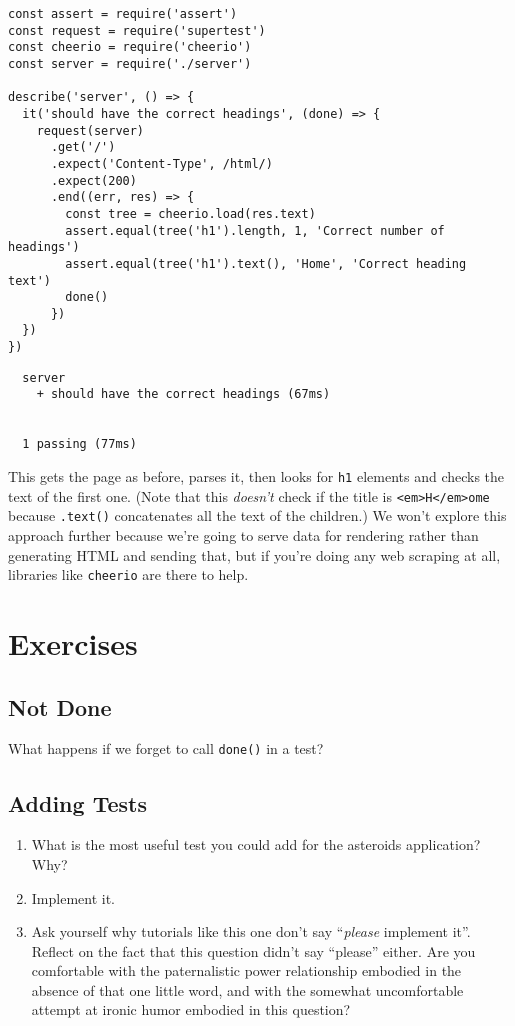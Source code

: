 \begin{verbatim}
const assert = require('assert')
const request = require('supertest')
const cheerio = require('cheerio')
const server = require('./server')

describe('server', () => {
  it('should have the correct headings', (done) => {
    request(server)
      .get('/')
      .expect('Content-Type', /html/)
      .expect(200)
      .end((err, res) => {
        const tree = cheerio.load(res.text)
        assert.equal(tree('h1').length, 1, 'Correct number of headings')
        assert.equal(tree('h1').text(), 'Home', 'Correct heading text')
        done()
      })
  })
})
\end{verbatim}

\begin{verbatim}
  server
    + should have the correct headings (67ms)


  1 passing (77ms)
\end{verbatim}

This gets the page as before,
parses it,
then looks for \texttt{h1} elements and checks the text of the first one.
(Note that this \emph{doesn't} check if the title is \texttt{\textless{}em\textgreater{}H\textless{}/em\textgreater{}ome}
because \texttt{.text()} concatenates all the text of the children.)
We won't explore this approach further because we're going to serve data for rendering
rather than generating HTML and sending that,
but if you're doing any web scraping at all,
libraries like \texttt{cheerio} are there to help.

\section{Exercises}\label{s:testing-exercises}

\subsection*{Not Done}
What happens if we forget to call \texttt{done()} in a test?

\subsection*{Adding Tests}
\begin{enumerate}
\item
  What is the most useful test you could add for the asteroids application?
  Why?
\item
  Implement it.
\item
  Ask yourself why tutorials like this one don't say ``\emph{please} implement it''.
  Reflect on the fact that this question didn't say ``please'' either.
  Are you comfortable with the paternalistic power relationship embodied in the absence of that one little word,
  and with the somewhat uncomfortable attempt at ironic humor embodied in this question?
\end{enumerate}


